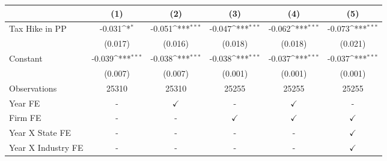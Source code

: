 {
\def\sym#1{\ifmmode^{#1}\else\(^{#1}\)\fi}
\begin{tabular}{l*{5}{c}}
\toprule
                    &\multicolumn{1}{c}{(1)}         &\multicolumn{1}{c}{(2)}         &\multicolumn{1}{c}{(3)}         &\multicolumn{1}{c}{(4)}         &\multicolumn{1}{c}{(5)}         \\
\midrule
Tax Hike in PP      &      -0.031\sym{*}  &      -0.051\sym{***}&      -0.047\sym{***}&      -0.062\sym{***}&      -0.073\sym{***}\\
                    &     (0.017)         &     (0.016)         &     (0.018)         &     (0.018)         &     (0.021)         \\
Constant            &      -0.039\sym{***}&      -0.038\sym{***}&      -0.038\sym{***}&      -0.037\sym{***}&      -0.037\sym{***}\\
                    &     (0.007)         &     (0.007)         &     (0.001)         &     (0.001)         &     (0.001)         \\
\midrule
Observations        &       25310         &       25310         &       25255         &       25255         &       25255         \\
Year FE             &           -         &$\checkmark$         &           -         &$\checkmark$         &           -         \\
Firm FE             &           -         &           -         &$\checkmark$         &$\checkmark$         &$\checkmark$         \\
Year X State FE     &           -         &           -         &           -         &           -         &$\checkmark$         \\
Year X Industry FE  &           -         &           -         &           -         &           -         &$\checkmark$         \\
\bottomrule
\end{tabular}
}
